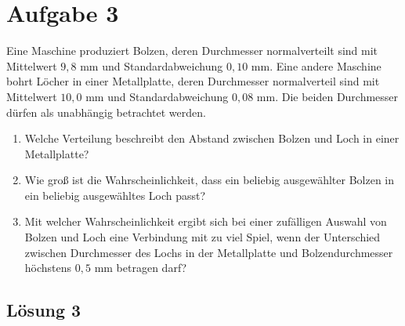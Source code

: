 \documentclass[main.tex]{subfiles}
\begin{document}
\section{Aufgabe 3}
Eine Maschine produziert Bolzen, deren Durchmesser normalverteilt sind mit Mittelwert $9,8$ mm und Standardabweichung $0,10$ mm. Eine andere Maschine bohrt Löcher in einer 
Metallplatte, deren Durchmesser normalverteil sind mit Mittelwert $10,0$ mm und Standardabweichung $0,08$ mm. Die beiden Durchmesser dürfen als unabhängig betrachtet werden.
\begin{enumerate}
\item Welche Verteilung beschreibt den Abstand zwischen Bolzen und Loch in einer Metallplatte?
\item Wie groß ist die Wahrscheinlichkeit, dass ein beliebig ausgewählter Bolzen in ein beliebig ausgewähltes Loch passt?
\item Mit welcher Wahrscheinlichkeit ergibt sich bei einer zufälligen Auswahl von Bolzen und Loch eine Verbindung mit zu viel Spiel, wenn der Unterschied zwischen 
Durchmesser des Lochs in der Metallplatte und Bolzendurchmesser höchstens $0,5$ mm betragen darf?
\end{enumerate}

\subsection{Lösung 3}
\end{document}
